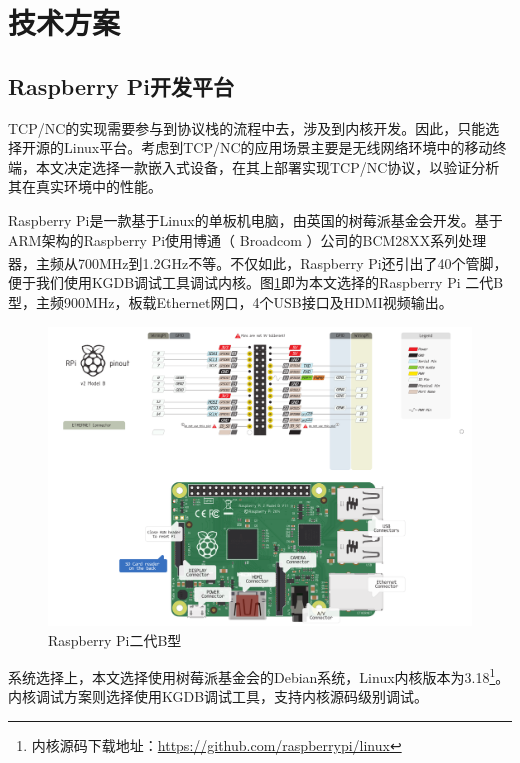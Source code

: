 \section{技术方案}
\subsection{Raspberry Pi开发平台}
TCP/NC的实现需要参与到协议栈的流程中去，涉及到内核开发。因此，只能选择开源的Linux平台。考虑到TCP/NC的应用场景主要是无线网络环境中的移动终端，本文决定选择一款嵌入式设备，在其上部署实现TCP/NC协议，以验证分析其在真实环境中的性能。
\par
Raspberry Pi是一款基于Linux的单板机电脑，由英国的树莓派基金会开发。基于ARM架构的Raspberry Pi使用博通（ Broadcom ）公司的BCM28XX系列处理器，主频从700MHz到1.2GHz不等\textsuperscript{\cite{rasp}}。不仅如此，Raspberry Pi还引出了40个管脚，便于我们使用KGDB调试工具调试内核。图\ref{RASP_EPS}即为本文选择的Raspberry Pi 二代B型，主频900MHz，板载Ethernet网口，4个USB接口及HDMI视频输出。
\begin{figure}[htbp]
	\centering
\includegraphics[width=6in]{figures/rasp.pdf}
\caption{Raspberry Pi二代B型}
\label{RASP_EPS}
\end{figure}
系统选择上，本文选择使用树莓派基金会的Debian系统，Linux内核版本为3.18\footnote{内核源码下载地址：\url{https://github.com/raspberrypi/linux}}。内核调试方案则选择使用KGDB调试工具，支持内核源码级别调试。

